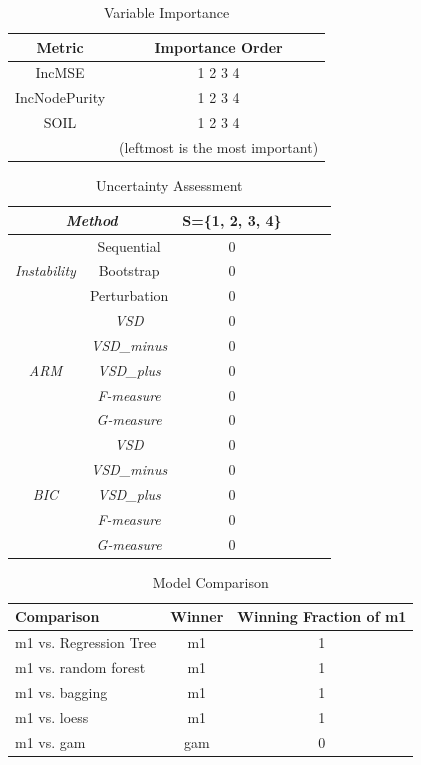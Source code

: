 \documentclass[11pt a4paper]{article}
\begin{document}
\begin{table}[H]
	\centering
	\caption{Variable Importance}
	\begin{tabular}{c|c}
		\hline
		Metric & Importance Order\\
		\hline
		IncMSE & 1 2 3 4  \\
		IncNodePurity & 1 2 3 4  \\
		SOIL & 1 2 3 4  \\
		 & (leftmost is the most important) \\
		\hline
	\end{tabular}
	\label{table:var-importance}
\end{table}

\begin{table}[H]
	\centering
	\caption{Uncertainty Assessment}
	\begin{tabular}{cc|cccc}
		\hline
		\multicolumn{2}{c|}{\textsl{Method}}& S=\{1, 2, 3, 4\}  \\
		\hline
		\multirow{3}{*}{\textsl{Instability}} & Sequential & 0\\
		& Bootstrap & 0 \\
		& Perturbation & 0 \\
		\hline
		\multirow{5}{*}{\textsl{ARM}} & \textsl{VSD} & 0 \\ 
		& \textsl{VSD\_minus} & 0 \\
		& \textsl{VSD\_plus} & 0 \\
		& \textsl{F-measure} & 0 \\
		& \textsl{G-measure} & 0 \\
		\hline
		\multirow{5}{*}{\textsl{BIC}} & \textsl{VSD} & 0 \\ 
		& \textsl{VSD\_minus} & 0 \\
		& \textsl{VSD\_plus} & 0 \\
		& \textsl{F-measure} & 0 \\
		& \textsl{G-measure} & 0 \\
		\hline
	\end{tabular}
	\label{table:uncertainty}
\end{table}

\begin{table}[H]
	\centering
	\caption{Model Comparison}
	\begin{tabular}{l|cc}
		\hline
		Comparison & Winner & Winning Fraction of m1\\
		\hline
		m1 vs. Regression Tree & m1 & 1 \\
		m1 vs. random forest & m1 & 1 \\
		m1 vs. bagging & m1 & 1 \\
		m1 vs. loess & m1 & 1 \\
		m1 vs. gam & gam & 0 \\
		\hline
	\end{tabular}
	\label{table:compare}
\end{table}
\end{document}
